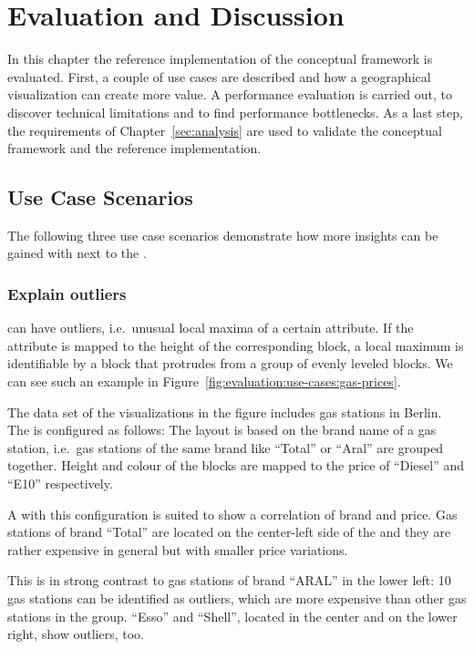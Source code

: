 \chapter{Evaluation and Discussion}\label{sec:evaluation}

In this chapter the reference implementation of the conceptual framework is evaluated.
First, a couple of use cases are described and how a geographical visualization can create more value.
A performance evaluation is carried out, to discover technical limitations and to find performance bottlenecks.
As a last step, the requirements of Chapter~\ref{sec:analysis} are used to validate the conceptual framework and the reference implementation.

\section{Use Case Scenarios}\label{sec:use-case}

The following three use case scenarios demonstrate how more insights can be gained with \gv{} next to the \tmap{}.

\subsection{Explain outliers}\label{sec:evaluation:use-cases:gas-stations}

\tmaps{} can have outliers, i.e.\ unusual local maxima of a certain attribute.
If the attribute is mapped to the height of the corresponding block, a local maximum is identifiable by a block that protrudes from a group of evenly leveled blocks.
We can see such an example in Figure~\ref{fig:evaluation:use-cases:gas-prices}.

The data set of the visualizations in the figure includes gas stations in Berlin.
The \tmap{} is configured as follows:
The layout is based on the brand name of a gas station, i.e.\ gas stations of the same brand like ``Total'' or ``Aral'' are grouped together.
Height and colour of the blocks are mapped to the price of ``Diesel'' and ``E10'' respectively.

A \tmap{} with this configuration is suited to show a correlation of brand and price.
Gas stations of brand ``Total'' are located on the center-left side of the \tmap{} and they are rather expensive in general but with smaller price variations.

This is in strong contrast to gas stations of brand ``ARAL'' in the lower left:
10 gas stations can be identified as outliers, which are more expensive than other gas stations in the group.
``Esso'' and ``Shell'', located in the center and on the lower right, show outliers, too.

